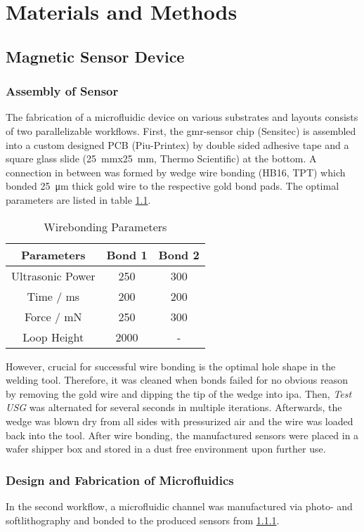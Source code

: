 \chapter{Materials and Methods}

\section{Magnetic Sensor Device} 
\subsection{Assembly of Sensor}
\label{sec:meth:sensor}
The fabrication of a microfluidic device on various substrates and layouts consists of two parallelizable workflows. First, the \gls{gmr}-sensor chip (Sensitec) is assembled into a custom designed PCB (Piu-Printex) by double sided adhesive tape and a square glass slide (\SI{25}{\milli\meter}x\SI{25}{\milli\meter}, Thermo Scientific) at the bottom. A connection in between was formed by wedge wire bonding (HB16, TPT) which bonded \SI{25}{\micro\meter} thick gold wire to the respective gold bond pads. The optimal parameters are listed in table \ref{tab:params_wirebonding}. 
\begin{table}[htb]
	\centering
\begin{tabular}{|c|c|c|}
	\hline
	Parameters & Bond 1 & Bond 2 \\
	\hline
	Ultrasonic Power & 250 & 300 \\
	\hline
	Time / ms & 200 & 200 \\
	\hline
	Force / mN & 250 & 300 \\
	\hline
	Loop Height & 2000 & - \\
	\hline
\end{tabular}
\caption{Wirebonding Parameters}
\label{tab:params_wirebonding}
\end{table}


However, crucial for successful wire bonding is the optimal hole shape in the welding tool. Therefore, it was cleaned when bonds failed for no obvious reason by removing the gold wire and dipping the tip of the wedge into \gls{ipa}. Then, \textit{Test USG} was alternated for several seconds in multiple iterations. Afterwards, the wedge was blown dry from all sides with pressurized air and the wire was loaded back into the tool.
After wire bonding, the manufactured sensors were placed in a wafer shipper box and stored in a dust free environment upon further use.

\subsection{Design and Fabrication of Microfluidics}
In the second workflow, a microfluidic channel was manufactured via photo- and softlithography and bonded to the produced sensors from \ref{sec:meth:sensor}.
